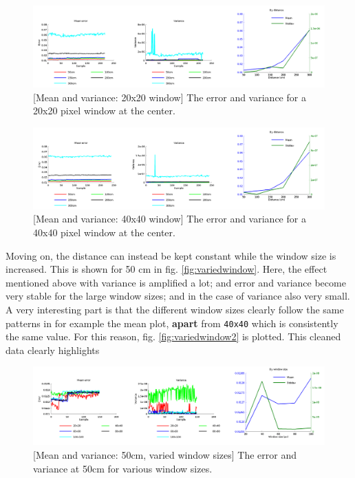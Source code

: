 \documentclass[11pt]{article}
\begin{document}
\begin{figure}[ht]
  \centering
  \includegraphics[width=1\textwidth]{figures/20x20-plot.png}
  [Mean and variance: 20x20 window]{\label{fig:20x20} The error and variance for a 20x20 pixel window at the center.}
\end{figure}
\begin{figure}[ht]
  \centering
  \includegraphics[width=1\textwidth]{figures/plot40x40.png}
  [Mean and variance: 40x40 window]{\label{fig:40x40} The error and variance for a 40x40 pixel window at the center.}
\end{figure}
Moving on, the distance can instead be kept constant while the window size is increased. This is shown for 50 cm in fig.  \vref{fig:variedwindow}. Here, the effect mentioned above with variance is amplified a lot; and error and variance become very stable for the large window sizes; and in the case of variance also very small. A very interesting part is that the different window sizes clearly follow the same patterns in for example the mean plot, \textbf{apart} from \texttt{40x40} which is consistently the same value. For this reason, fig. \vref{fig:variedwindow2} is plotted. This cleaned data clearly highlights 
\begin{figure}[ht]
  \centering
  \includegraphics[width=1\textwidth]{figures/plotwindowsizes.png}
  [Mean and variance: 50cm, varied window sizes]{\label{fig:variedwindow} The error and variance at 50cm for various window sizes.}
\end{figure}
\end{document}
